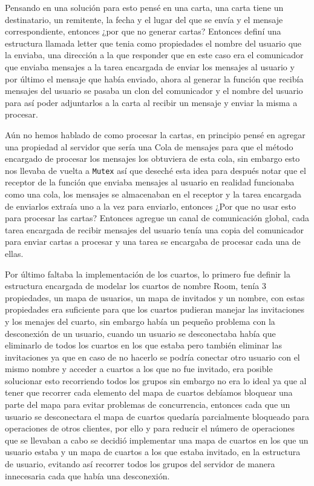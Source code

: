 \documentclass[12pt, titlepage]{article}
\begin{document}
Pensando en una solución para esto pensé en una carta, una carta tiene un destinatario, un remitente, la fecha y el lugar del que se envía y el mensaje correspondiente, entonces ¿por que no generar cartas? Entonces definí una estructura llamada letter que tenia como propiedades el nombre del usuario que la enviaba, una dirección a la que responder que en este caso era el comunicador que enviaba mensajes a la tarea encargada de enviar los mensajes al usuario y por último el mensaje que había enviado, ahora al generar la función que recibía mensajes del usuario se pasaba un clon del comunicador y el nombre del usuario para así poder adjuntarlos a la carta al recibir un mensaje y enviar la misma a procesar.

Aún no hemos hablado de como procesar la cartas, en principio pensé en agregar una propiedad al servidor que sería una Cola de mensajes para que el método encargado de procesar los mensajes los obtuviera de esta cola, sin embargo esto nos llevaba de vuelta a \lstinline|Mutex| así que deseché esta idea para después notar que el receptor de la función que enviaba mensajes al usuario en realidad funcionaba como una cola, los mensajes se almacenaban en el receptor y la tarea encargada de enviarlos extraía uno a la vez para enviarlo, entonces ¿Por que no usar esto para procesar las cartas? Entonces agregue un canal de comunicación global, cada tarea encargada de recibir mensajes del usuario tenía una copia del comunicador para enviar cartas a procesar y una tarea se encargaba de procesar cada una de ellas.

Por último faltaba la implementación de los cuartos, lo primero fue definir la estructura encargada de modelar los cuartos de nombre Room, tenía 3 propiedades, un mapa de usuarios, un mapa de invitados y un nombre, con estas propiedades era suficiente para que los cuartos pudieran manejar las invitaciones y los menajes del cuarto, sin embargo había un pequeño problema con la desconexión de un usuario, cuando un usuario se desconectaba había que eliminarlo de todos los cuartos en los que estaba pero también eliminar las invitaciones ya que en caso de no hacerlo se podría conectar otro usuario con el mismo nombre y acceder a cuartos a los que no fue invitado, era posible solucionar esto recorriendo todos los grupos sin embargo no era lo ideal ya que al tener que recorrer cada elemento del mapa de cuartos debíamos bloquear una parte del mapa para evitar problemas de concurrencia, entonces cada que un usuario se desconectara el mapa de cuartos quedaría parcialmente bloqueado para operaciones de otros clientes, por ello y para reducir el número de operaciones que se llevaban a cabo se decidió implementar una mapa de cuartos en los que un usuario estaba y un mapa de cuartos a los que estaba invitado, en la estructura de usuario, evitando así recorrer todos los grupos del servidor de manera innecesaria cada que había una desconexión.
\end{document}
